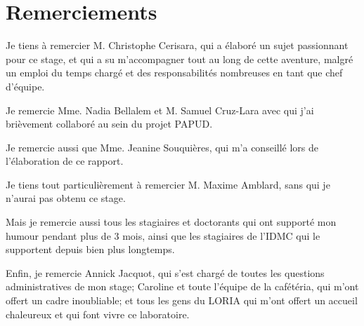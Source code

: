 \maketitle
{}
	
	
\makesecondtitle

\section*{Remerciements}
{
	Je tiens à remercier M. Christophe Cerisara, qui a élaboré un sujet passionnant pour ce stage, et qui a su m'accompagner tout au long de cette aventure, malgré un emploi du temps chargé et des responsabilités nombreuses en tant que chef d'équipe.
	
	Je remercie Mme. Nadia Bellalem et M. Samuel Cruz-Lara avec qui j'ai brièvement collaboré au sein du projet PAPUD. %
	
	Je remercie aussi que Mme. Jeanine Souquières, qui m'a conseillé lors de l'élaboration de ce rapport.
	
	Je tiens tout particulièrement à remercier 
	M. Maxime Amblard, sans qui je n'aurai pas obtenu ce stage.
	
	Mais je remercie aussi tous les stagiaires et doctorants qui ont supporté mon humour pendant plus de 3 mois, ainsi que les stagiaires de l'IDMC qui le supportent depuis bien plus longtemps.
	
	Enfin, je remercie Annick Jacquot, qui s'est chargé de toutes les questions administratives de mon stage; Caroline et toute l'équipe de la cafétéria, qui m'ont offert un cadre inoubliable; et tous les gens du LORIA qui m'ont offert un accueil chaleureux et qui font vivre ce laboratoire.
}


